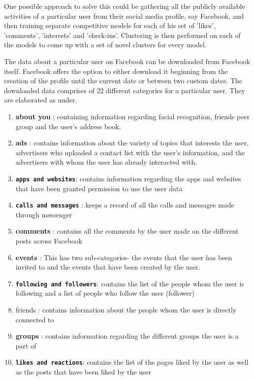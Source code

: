 One possible approach to solve this could be gathering all the publicly available activities of a particular user from their social media profile, say Facebook, and then training separate competitive models for each of his set of 'likes', 'comments', 'interests' and 'check-ins'. Clustering is then performed on each of the models to come up with a set of novel clusters for every model. 

The data about a particular user on Facebook can be downloaded from Facebook itself. Facebook offers the option to either download it beginning from the creation of the profile until the current date or between two custom dates.
The downloaded data comprises of 22 different categories for a particular user. They are elaborated as under. 

\begin{enumerate}[i]
   \item \textbf{about you }: containing information regarding facial recognition, friends peer group and the user's address book.
   \item \textbf{ads} : contains information about the variety of topics that interests the user, advertisers who uploaded a contact list with the user's information, and the advertisers with whom the user has already interacted with.
   \item \textbf{\texttt{apps and websites}}: contains information regarding the apps and websites that have been granted permission to use the user data
   \item \textbf{\texttt{calls and messages}} : keeps a record of all the calls and messages made through messenger
   \item \textbf{comments} : contains all the comments by the user made on the different posts across Facebook
   \item \textbf{events} : This has two sub-categories- the events that the user has been invited to and the events that have been created by the user.
   \item \textbf{\texttt{following and followers}}: contains the list of the people whom the user is following and a list of people who follow the user (follower)
   \item friends : contains information about the people whom the user is directly connected to
   \item \textbf{groups} : contains information regarding the different groups the user is a part of
   \item \textbf{\texttt{likes and reactions}}: contains the list of the pages liked by the user as well as the posts that have been liked by the user

\end{enumerate}
